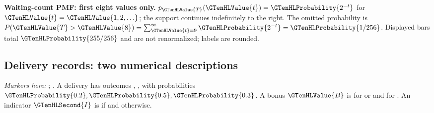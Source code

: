 \Needspace{6.8cm}
\par\noindent \begin{minipage}[t]{.98\linewidth}
\centering
{}
\par\small \textbf{Waiting-count PMF: first eight values only.} $p_{\GTenHLValue{T}}(\GTenHLValue{t})=\GTenHLProbability{2^{-t}}$ for $\GTenHLValue{t}=\GTenHLValue{1,2,\ldots}$; the support continues indefinitely to the right. The omitted probability is $P(\GTenHLValue{T}>\GTenHLValue{8})=\sum_{\GTenHLValue{t}=9}^{\infty}\GTenHLProbability{2^{-t}}=\GTenHLProbability{1/256}$. Displayed bars total $\GTenHLProbability{255/256}$ and are not renormalized; labels are rounded.
\end{minipage}\par\medskip



\subsection{Delivery records: two numerical descriptions}
\label{subsec:t2-c1-delivery-records-two-numerical-descriptions}
\textit{Markers here:} ; .
A delivery has outcomes , ,  with probabilities $\GTenHLProbability{0.2},\GTenHLProbability{0.5},\GTenHLProbability{0.3}$. A bonus $\GTenHLValue{B}$ is  for  or  and  for . An indicator $\GTenHLSecond{I}$ is  if  and  otherwise.


